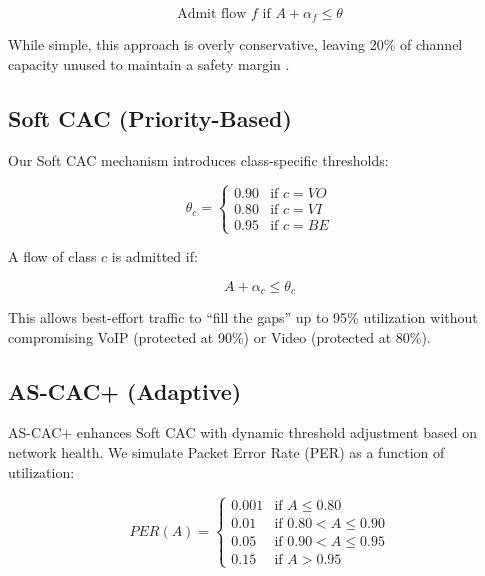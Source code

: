 \documentclass[conference]{IEEEtran}
\begin{document}
\begin{equation}
\text{Admit flow } f \text{ if } A + \alpha_f \leq \theta
\label{eq:hard_cac}
\end{equation}

While simple, this approach is overly conservative, leaving 20\% of channel capacity unused to maintain a safety margin \cite{8}.

\subsection{Soft CAC (Priority-Based)}

Our Soft CAC mechanism introduces class-specific thresholds:

\begin{equation}
\theta_c = \begin{cases}
0.90 & \text{if } c = VO \\
0.80 & \text{if } c = VI \\
0.95 & \text{if } c = BE
\end{cases}
\label{eq:soft_thresholds}
\end{equation}

A flow of class $c$ is admitted if:

\begin{equation}
A + \alpha_c \leq \theta_c
\label{eq:soft_admission}
\end{equation}

This allows best-effort traffic to ``fill the gaps'' up to 95\% utilization without compromising VoIP (protected at 90\%) or Video (protected at 80\%).

\subsection{AS-CAC+ (Adaptive)}

AS-CAC+ enhances Soft CAC with dynamic threshold adjustment based on network health. We simulate Packet Error Rate (PER) as a function of utilization:

\begin{equation}
PER(A) = \begin{cases}
0.001 & \text{if } A \leq 0.80 \\
0.01 & \text{if } 0.80 < A \leq 0.90 \\
0.05 & \text{if } 0.90 < A \leq 0.95 \\
0.15 & \text{if } A > 0.95
\end{cases}
\label{eq:per}
\end{equation}
\end{document}
